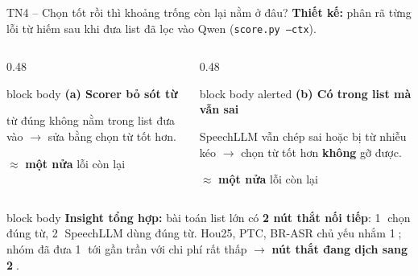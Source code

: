 \documentclass[aspectratio=169,xcolor=table]{beamer}
\newcommand{\hi}[1]{\textcolor{Primary}{\textbf{#1}}}
\newcommand{\ra}{$\rightarrow$}
\begin{document}
\begin{frame}{TN4 -- Chọn tốt rồi thì khoảng trống còn lại nằm ở đâu?}
\textbf{Thiết kế:} phân rã từng lỗi từ hiếm sau khi đưa list đã lọc vào Qwen (\texttt{score.py --ctx}).\par\vspace{0.3cm}
\begin{columns}[T]
\begin{column}{0.48\textwidth}
\begin{beamercolorbox}[sep=0.55em,rounded=true]{block body}
\textbf{(a) Scorer bỏ sót từ}\par\small
từ đúng không nằm trong list đưa vào \ra{} sửa bằng chọn từ tốt hơn.\par\vspace{0.1cm}
$\approx$ \textbf{một nửa} lỗi còn lại
\end{beamercolorbox}
\end{column}
\begin{column}{0.48\textwidth}
\begin{beamercolorbox}[sep=0.55em,rounded=true]{block body alerted}
\textbf{(b) Có trong list mà vẫn sai}\par\small
SpeechLLM vẫn chép sai hoặc bị từ nhiễu kéo \ra{} chọn từ tốt hơn \textbf{không} gỡ được.\par\vspace{0.1cm}
$\approx$ \textbf{một nửa} lỗi còn lại
\end{beamercolorbox}
\end{column}
\end{columns}
\vspace{0.45cm}
\begin{beamercolorbox}[sep=0.6em,rounded=true]{block body}
\textbf{Insight tổng hợp:} bài toán list lớn có \hi{2 nút thắt nối tiếp}: \textcircled{\scriptsize 1} chọn đúng từ, \textcircled{\scriptsize 2} SpeechLLM dùng đúng từ.
Hou25, PTC, BR-ASR chủ yếu nhắm \textcircled{\scriptsize 1}; nhóm đã đưa \textcircled{\scriptsize 1} tới gần trần với chi phí rất thấp \ra{} \textbf{nút thắt đang dịch sang \textcircled{\scriptsize 2}}.
\end{beamercolorbox}
\end{frame}

\end{document}
